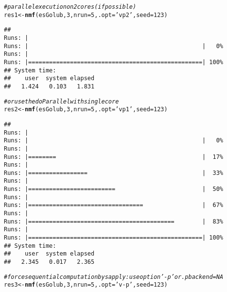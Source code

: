 \documentclass[a4paper]{article}\usepackage[]{graphicx}\usepackage[]{color}
\makeatletter
\newcommand{\hlnum}[1]{\textcolor[rgb]{0.686,0.059,0.569}{#1}}%
\newcommand{\hlstr}[1]{\textcolor[rgb]{0.192,0.494,0.8}{#1}}%
\newcommand{\hlcom}[1]{\textcolor[rgb]{0.678,0.584,0.686}{\textit{#1}}}%
\newcommand{\hlstd}[1]{\textcolor[rgb]{0.345,0.345,0.345}{#1}}%
\newcommand{\hlkwb}[1]{\textcolor[rgb]{0.69,0.353,0.396}{#1}}%
\newcommand{\hlkwc}[1]{\textcolor[rgb]{0.333,0.667,0.333}{#1}}%
\newcommand{\hlkwd}[1]{\textcolor[rgb]{0.737,0.353,0.396}{\textbf{#1}}}%
\newenvironment{kframe}{%
 \def\at@end@of@kframe{}%
 \ifinner\ifhmode%
  \def\at@end@of@kframe{\end{minipage}}%
  \begin{minipage}{\columnwidth}%
 \fi\fi%
 \def\FrameCommand##1{\hskip\@totalleftmargin \hskip-\fboxsep
 \colorbox{shadecolor}{##1}\hskip-\fboxsep
     \hskip-\linewidth \hskip-\@totalleftmargin \hskip\columnwidth}%
 \MakeFramed {\advance\hsize-\width
   \@totalleftmargin\z@ \linewidth\hsize
   \@setminipage}}%
 {\par\unskip\endMakeFramed%
 \at@end@of@kframe}
\newenvironment{knitrout}{}{} %
\makeatother
\begin{document}
\begin{knitrout}
\color{fgcolor}\begin{kframe}
\begin{alltt}
\hlcom{# parallel execution on 2 cores (if possible)}
\hlstd{res1} \hlkwb{<-} \hlkwd{nmf}\hlstd{(esGolub,} \hlnum{3}\hlstd{,} \hlkwc{nrun}\hlstd{=}\hlnum{5}\hlstd{,} \hlkwc{.opt}\hlstd{=}\hlstr{'vp2'}\hlstd{,} \hlkwc{seed}\hlstd{=}\hlnum{123}\hlstd{)}
\end{alltt}


{\ttfamily\noindent\itshape\color{messagecolor}{\#\# NMF algorithm: 'brunet'\\\#\# Multiple runs: 5\\\#\# Mode: parallel (2/4 core(s))}}\begin{verbatim}
## 
Runs: |                                                        
Runs: |                                                  |   0%
Runs: |                                                        
Runs: |==================================================| 100%
## System time:
##    user  system elapsed 
##   1.424   0.103   1.831
\end{verbatim}
\begin{alltt}
\hlcom{# or use the doParallel with single core}
\hlstd{res2} \hlkwb{<-} \hlkwd{nmf}\hlstd{(esGolub,} \hlnum{3}\hlstd{,} \hlkwc{nrun}\hlstd{=}\hlnum{5}\hlstd{,} \hlkwc{.opt}\hlstd{=}\hlstr{'vp1'}\hlstd{,} \hlkwc{seed}\hlstd{=}\hlnum{123}\hlstd{)}
\end{alltt}


{\ttfamily\noindent\itshape\color{messagecolor}{\#\# NMF algorithm: 'brunet'\\\#\# Multiple runs: 5\\\#\# Mode: sequential [foreach:doParallelMC]}}\begin{verbatim}
## 
Runs: |                                                        
Runs: |                                                  |   0%
Runs: |                                                        
Runs: |========                                          |  17%
Runs: |                                                        
Runs: |=================                                 |  33%
Runs: |                                                        
Runs: |=========================                         |  50%
Runs: |                                                        
Runs: |=================================                 |  67%
Runs: |                                                        
Runs: |==========================================        |  83%
Runs: |                                                        
Runs: |==================================================| 100%
## System time:
##    user  system elapsed 
##   2.345   0.017   2.365
\end{verbatim}
\begin{alltt}
\hlcom{# force sequential computation by sapply: use option '-p' or .pbackend=NA  }
\hlstd{res3} \hlkwb{<-} \hlkwd{nmf}\hlstd{(esGolub,} \hlnum{3}\hlstd{,} \hlkwc{nrun}\hlstd{=}\hlnum{5}\hlstd{,} \hlkwc{.opt}\hlstd{=}\hlstr{'v-p'}\hlstd{,} \hlkwc{seed}\hlstd{=}\hlnum{123}\hlstd{)}
\end{alltt}



\end{kframe}
\end{knitrout}
\end{document}
